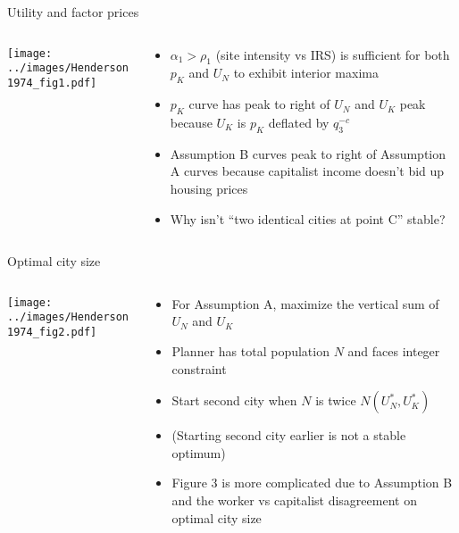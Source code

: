 \documentclass[11pt,notes=hide,aspectratio=169]{beamer}
\begin{document}
\begin{frame}{Utility and factor prices}
\begin{columns}
\begin{column}{.48\textwidth}
\texttt{[image: ../images/Henderson1974\_fig1.pdf]}
\end{column}
\begin{column}{.5\textwidth}
\begin{itemize}
\item $\alpha_1 > \rho_1$ (site intensity vs IRS) is sufficient for both $p_K$ and $U_N$ to exhibit interior maxima
\item $p_K$ curve has peak to right of $U_N$ and $U_K$ peak because $U_K$ is $p_K$ deflated by $q_3^{-c}$
\item Assumption B curves peak to right of Assumption A curves because capitalist income doesn't bid up housing prices
\item Why isn't ``two identical cities at point C'' stable?
\end{itemize}
\end{column}
\end{columns}
\end{frame}
\begin{frame}{Optimal city size}
\begin{columns}
\begin{column}{.48\textwidth}
\texttt{[image: ../images/Henderson1974\_fig2.pdf]}
\end{column}
\begin{column}{.5\textwidth}
\begin{itemize}
\item For Assumption A, maximize the vertical sum of $U_N$ and $U_K$
\item Planner has total population $N$ and faces integer constraint
\item Start second city when $N$ is twice $N(U_N^*,U_K^*)$
\item[] (Starting second city earlier is not a stable optimum)
\item Figure 3 is more complicated due to Assumption B and the worker vs capitalist disagreement on optimal city size
\end{itemize}
\end{column}
\end{columns}
\end{frame}
\end{document}
